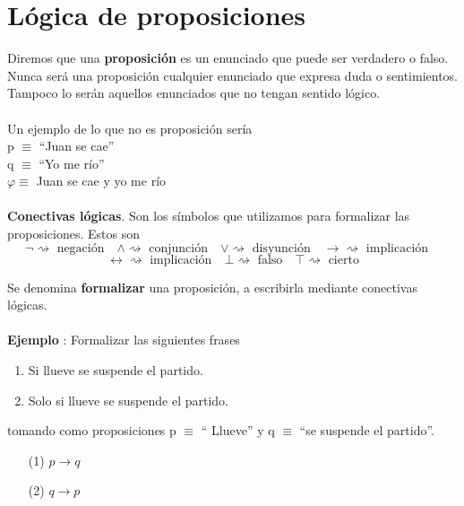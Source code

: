 
\section*{Lógica de proposiciones}
\begin{definition} Diremos que una \textbf{proposición} es un enunciado que puede ser verdadero o falso. Nunca será una proposición cualquier enunciado que expresa duda o sentimientos. Tampoco lo serán aquellos enunciados que no tengan sentido lógico. 
\end{definition}
\paragraph{}
Un ejemplo de lo que no es proposición sería
\\
p $\equiv$ ``Juan se cae'' 
\\
q $\equiv$ ``Yo me río''
\\
$\varphi \equiv$ Juan se cae y yo me río  
\paragraph{}
\textbf{Conectivas lógicas}. Son los símbolos que utilizamos para formalizar las proposiciones. Estos son 
\[ \lnot \rightsquigarrow \mbox{ negación} \quad \wedge \rightsquigarrow \mbox{ conjunción} \quad 
\lor \rightsquigarrow \mbox{ disyunción} \quad \rightarrow \rightsquigarrow \mbox{ implicación} \quad
 \]  
 \[\leftrightarrow \rightsquigarrow \mbox{ implicación} \quad \bot \rightsquigarrow \mbox{ falso} \quad 
\top \rightsquigarrow \mbox{ cierto} \]

\begin{definition} Se denomina \textbf{formalizar} una proposición, a escribirla mediante conectivas lógicas. 
\end{definition}
\paragraph{}
\addtocounter{ej}{1} %
\textbf{Ejemplo }: Formalizar las siguientes frases 
\begin{enumerate}
	\item Si llueve se suspende el partido. 
	\item Solo si llueve se suspende el partido.
\end{enumerate}
tomando como proposiciones p $\equiv$ `` Llueve'' y q $\equiv$ ``se suspende el partido''.
\begin{itemize}
	\item[(1)] $ p\rightarrow q$
	\item[(2)] $ q\rightarrow p$
\end{itemize} 
